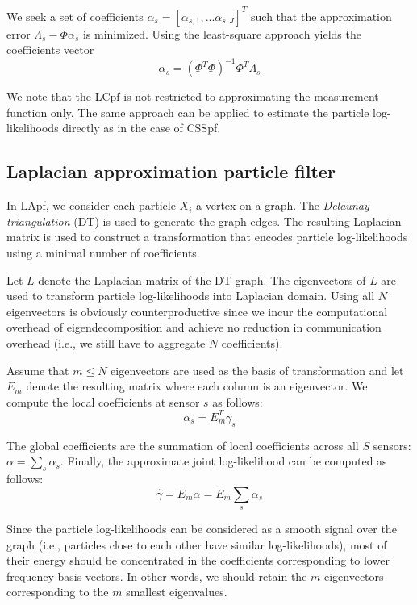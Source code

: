 \documentclass[10pt,letterpaper,final]{article}
\begin{document}
We seek a set of coefficients $\alpha_s = [\alpha_{s,1},...\alpha_{s,J}]^T$ such that the approximation error $\Lambda_s - \Phi \alpha_s$ is minimized. Using the least-square approach yields the coefficients vector
\begin{equation}
\alpha_s = (\Phi^T\Phi)^{-1}\Phi^T\Lambda_s
\end{equation}

We note that the LCpf is not restricted to approximating the measurement function only. The same approach can be applied to estimate the particle log-likelihoods directly as in the case of CSSpf. %

\subsection{Laplacian approximation particle filter}
In LApf, we consider each particle $X_i$ a vertex on a graph. The \textit{Delaunay triangulation} (DT) is used to generate the graph edges. The resulting Laplacian matrix is used to construct a transformation that encodes particle log-likelihoods using a minimal number of coefficients. 

Let $L$ denote the Laplacian matrix of the DT graph. The eigenvectors of $L$ are used to transform particle log-likelihoods into Laplacian domain. Using all $N$ eigenvectors is obviously counterproductive since we incur the computational overhead of eigendecomposition and achieve no reduction in communication overhead (i.e., we still have to aggregate $N$ coefficients). 

Assume that $m\leq N$ eigenvectors are used as the basis of transformation and let $E_m$ denote the resulting matrix where each column is an eigenvector. We compute the local coefficients at sensor $s$ as follows:
\begin{equation}
\alpha_s = E_m^T\gamma_s
\end{equation}

The global coefficients are the summation of local coefficients across all $S$ sensors: $\alpha = \sum_s \alpha_s$. Finally, the approximate joint log-likelihood can be computed as follows:
\begin{equation}
\hat{\gamma} = E_m\alpha = E_m \sum_s \alpha_s
\end{equation}

Since the particle log-likelihoods can be considered as a smooth signal over the graph (i.e., particles close to each other have similar log-likelihoods), most of their energy should be concentrated in the coefficients corresponding to lower frequency basis vectors. In other words, we should retain the $m$ eigenvectors corresponding to the $m$ smallest eigenvalues. 
\end{document}
